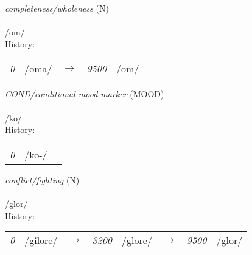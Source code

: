 \vspace{15pt}
\begin{nopagebreak}
 \textit{completeness/wholeness} (N)\\
\\
\noindent /{\textprimstress}om/\\


\noindent History:

\vspace{-0pt}
\hspace{40pt}
\begin{tabular}{ccc}
\textit{0} & /oma/&$\rightarrow$ & \textit{9500} & /om/& \\
\end{tabular}

\vspace{20pt}\hline

\end{nopagebreak}
\filbreak



\vspace{15pt}
\begin{nopagebreak}
 \textit{COND/conditional mood marker} (MOOD)\\
\\
\noindent /k{\textprimstress}o/\\


\noindent History:

\vspace{-0pt}
\hspace{40pt}
\begin{tabular}{ccc}
\textit{0} & /ko-/& \\
\end{tabular}

\vspace{20pt}\hline

\end{nopagebreak}
\filbreak



\vspace{15pt}
\begin{nopagebreak}
 \textit{conflict/fighting} (N)\\
\\
\noindent /gl{\textprimstress}or/\\


\noindent History:

\vspace{-0pt}
\hspace{40pt}
\begin{tabular}{ccc}
\textit{0} & /gilore/&$\rightarrow$ & \textit{3200} & /glore/&$\rightarrow$ & \textit{9500} & /glor/& \\
\end{tabular}

\vspace{20pt}\hline

\end{nopagebreak}
\filbreak



